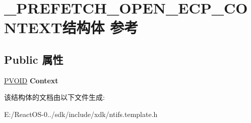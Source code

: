 \hypertarget{struct___p_r_e_f_e_t_c_h___o_p_e_n___e_c_p___c_o_n_t_e_x_t}{}\section{\+\_\+\+P\+R\+E\+F\+E\+T\+C\+H\+\_\+\+O\+P\+E\+N\+\_\+\+E\+C\+P\+\_\+\+C\+O\+N\+T\+E\+X\+T结构体 参考}
\label{struct___p_r_e_f_e_t_c_h___o_p_e_n___e_c_p___c_o_n_t_e_x_t}
\subsection*{Public 属性}
\begin{DoxyCompactItemize}
\item 
\mbox{\label{struct___p_r_e_f_e_t_c_h___o_p_e_n___e_c_p___c_o_n_t_e_x_t_a4d5911bc6c17bcab56b482319f37d474}} 
\hyperlink{interfacevoid}{P\+V\+O\+ID} {\bfseries Context}
\end{DoxyCompactItemize}


该结构体的文档由以下文件生成\+:\begin{DoxyCompactItemize}
\item 
E\+:/\+React\+O\+S-\/0../sdk/include/xdk/ntifs.\+template.\+h\end{DoxyCompactItemize}
